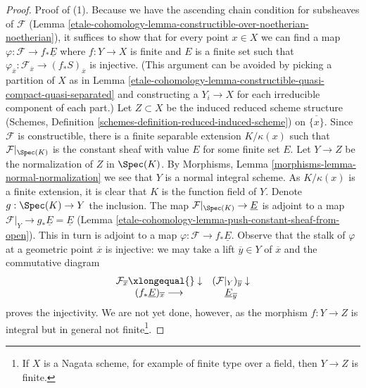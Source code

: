 \begin{proof}
Proof of (1). Because we have the ascending chain condition for
subsheaves of $\mathcal{F}$
(Lemma \ref{etale-cohomology-lemma-constructible-over-noetherian-noetherian}), it
suffices to show that for every point $x \in X$ we
can find a map $\varphi : \mathcal{F} \to f_*\underline{E}$ where
$f : Y \to X$ is finite and $E$ is a finite set such that
$\varphi_{\overline{x}} : \mathcal{F}_{\overline{x}} \to
(f_*S)_{\overline{x}}$ is injective.
(This argument can be avoided by picking a partition of $X$ as in
Lemma \ref{etale-cohomology-lemma-constructible-quasi-compact-quasi-separated}
and constructing a $Y_i \to X$ for each irreducible component
of each part.)
Let $Z \subset X$ be the induced reduced scheme structure
(Schemes, Definition \ref{schemes-definition-reduced-induced-scheme})
on $\overline{\{x\}}$.
Since $\mathcal{F}$ is constructible, there is a finite separable
extension $K/\kappa(x)$ such that
$\mathcal{F}|_{\Spec(K)}$ is the constant sheaf with value $E$
for some finite set $E$. Let $Y \to Z$ be the normalization
of $Z$ in $\Spec(K)$.
By Morphisms, Lemma \ref{morphisms-lemma-normal-normalization}
we see that $Y$ is a normal integral scheme.
As $K/\kappa(x)$ is a finite extension, it is clear that $K$ is the function
field of $Y$. Denote $g : \Spec(K) \to Y$ the inclusion.
The map $\mathcal{F}|_{\Spec(K)} \to \underline{E}$ is adjoint
to a map $\mathcal{F}|_Y \to g_*\underline{E} = \underline{E}$
(Lemma \ref{etale-cohomology-lemma-push-constant-sheaf-from-open}).
This in turn is adjoint to a map
$\varphi : \mathcal{F} \to f_*\underline{E}$.
Observe that the stalk of $\varphi$ at a geometric point
$\overline{x}$ is injective: we may take a lift $\overline{y} \in Y$
of $\overline{x}$ and the commutative diagram
$$
\begin{array}{cc}\mathcal{F}_{\overline{x}} \xlongequal{}\downarrow & (\mathcal{F}|_Y)_{\overline{y}} \downarrow \\ (f_*\underline{E})_{\overline{x}} \longrightarrow & \underline{E}_{\overline{y}}\end{array}
$$
proves the injectivity. We are not yet done, however, as the
morphism $f : Y \to Z$ is integral but in general not
finite\footnote{If $X$ is a Nagata scheme, for example of finite
type over a field, then $Y \to Z$ is finite.}.


\end{proof}
